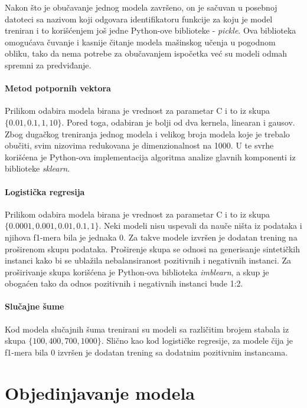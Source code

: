 Nakon što je obučavanje jednog modela završeno, on je sačuvan u posebnoj datoteci sa nazivom koji odgovara identifikatoru funkcije za koju je model treniran i to korišćenjem još jedne Python-ove biblioteke - \textit{pickle}. Ova biblioteka omogućava čuvanje i kasnije čitanje modela mašinskog učenja u pogodnom obliku, tako da nema potrebe za obučavanjem ispočetka već su modeli odmah spremni za predviđanje.


\paragraph{Metod potpornih vektora}

Prilikom odabira modela birana je vrednost za parametar C i to iz skupa $\{0.01, 0.1, 1, 10\}$. Pored toga, odabiran je bolji od dva kernela, linearan i gausov. Zbog dugačkog treniranja jednog modela i velikog broja modela koje je trebalo obučiti, svim nizovima redukovana je dimenzionalnost na 1000. U te svrhe korišćena je Python-ova implementacija algoritma analize glavnih komponenti iz biblioteke \textit{sklearn}.  



\paragraph{Logistička regresija}

Prilikom odabira modela birana je vrednost za parametar C i to iz skupa $\{0.0001, 0.001, 0.01, 0.1, 1\}$. Neki modeli nisu uspevali da nauče ništa iz podataka i njihova f1-mera bila je jednaka 0. Za takve modele izvršen je dodatan trening na proširenom skupu podataka. Proširenje skupa se odnosi na generisanje sintetičkih instanci kako bi se ublažila nebalansiranost pozitivnih i negativnih instanci. Za proširivanje skupa korišćena je Python-ova biblioteka \textit{imblearn}, a skup je obogaćen tako da odnos pozitivnih i negativnih instanci bude 1:2.


\paragraph{Slučajne šume}

Kod modela slučajnih šuma trenirani su modeli sa različitim brojem stabala iz skupa $\{100, 400, 700, 1000\}$. Slično kao kod logističke regresije, za modele čija je f1-mera bila 0 izvršen je dodatan trening sa dodatnim pozitivnim instancama.



\section{Objedinjavanje modela}

